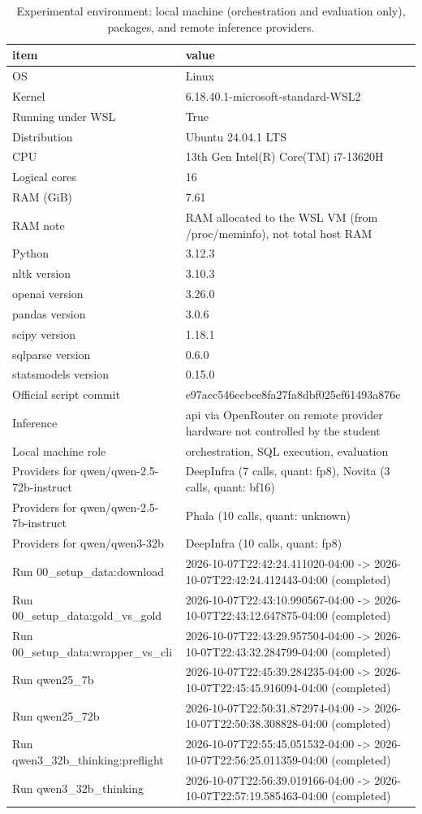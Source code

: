\begin{table}[htbp]
\caption{Experimental environment: local machine (orchestration and evaluation only), packages, and remote inference providers.}
\label{tab:task1_environment}
\begin{tabular}{ll}
\toprule
item & value \\
\midrule
OS & Linux \\
Kernel & 6.18.40.1-microsoft-standard-WSL2 \\
Running under WSL & True \\
Distribution & Ubuntu 24.04.1 LTS \\
CPU & 13th Gen Intel(R) Core(TM) i7-13620H \\
Logical cores & 16 \\
RAM (GiB) & 7.61 \\
RAM note & RAM allocated to the WSL VM (from /proc/meminfo), not total host RAM \\
Python & 3.12.3 \\
nltk version & 3.10.3 \\
openai version & 3.26.0 \\
pandas version & 3.0.6 \\
scipy version & 1.18.1 \\
sqlparse version & 0.6.0 \\
statsmodels version & 0.15.0 \\
Official script commit & e97acc546ecbee8fa27fa8dbf025ef61493a876c \\
Inference & api via OpenRouter on remote provider hardware not controlled by the student \\
Local machine role & orchestration, SQL execution, evaluation \\
Providers for qwen/qwen-2.5-72b-instruct & DeepInfra (7 calls, quant: fp8), Novita (3 calls, quant: bf16) \\
Providers for qwen/qwen-2.5-7b-instruct & Phala (10 calls, quant: unknown) \\
Providers for qwen/qwen3-32b & DeepInfra (10 calls, quant: fp8) \\
Run 00_setup_data:download & 2026-10-07T22:42:24.411020-04:00 -> 2026-10-07T22:42:24.412443-04:00 (completed) \\
Run 00_setup_data:gold_vs_gold & 2026-10-07T22:43:10.990567-04:00 -> 2026-10-07T22:43:12.647875-04:00 (completed) \\
Run 00_setup_data:wrapper_vs_cli & 2026-10-07T22:43:29.957504-04:00 -> 2026-10-07T22:43:32.284799-04:00 (completed) \\
Run qwen25_7b & 2026-10-07T22:45:39.284235-04:00 -> 2026-10-07T22:45:45.916094-04:00 (completed) \\
Run qwen25_72b & 2026-10-07T22:50:31.872974-04:00 -> 2026-10-07T22:50:38.308828-04:00 (completed) \\
Run qwen3_32b_thinking:preflight & 2026-10-07T22:55:45.051532-04:00 -> 2026-10-07T22:56:25.011359-04:00 (completed) \\
Run qwen3_32b_thinking & 2026-10-07T22:56:39.019166-04:00 -> 2026-10-07T22:57:19.585463-04:00 (completed) \\
\bottomrule
\end{tabular}
\end{table}
